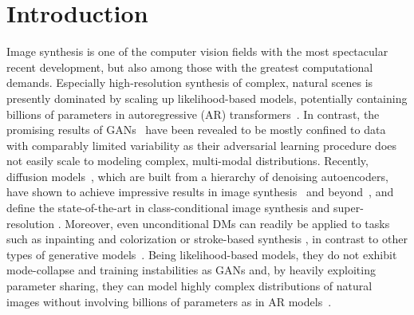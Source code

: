 \documentclass[10pt,twocolumn,letterpaper]{article}
\begin{document}
%
\vspace{-1.5em}
\section{Introduction}
\vspace{-0.5em}
\label{sec:intro}
\enlargethispage{\baselineskip}
%
\firststagecomparison
%
%
%
%
%
%
%
%
%
%
%
%
%
%
%
%
%
%
%
Image synthesis is one of the computer vision fields with the most spectacular recent development, but also among those with the greatest computational demands. Especially high-resolution synthesis of complex, natural scenes is presently dominated by %
scaling up likelihood-based models, potentially containing billions of parameters in autoregressive (AR) transformers~\cite{DBLP:journals/corr/abs-2102-12092, DBLP:conf/nips/RazaviOV19}.
%
%
%
In contrast, the promising results of GANs~\cite{goodfellow2014GAN, bigganbrock, karras2019stylebased} have been revealed to be mostly confined to data with comparably limited variability as their adversarial learning procedure does not easily scale to modeling complex, multi-modal distributions. %
Recently, diffusion models~\cite{DBLP:journals/corr/Sohl-DicksteinW15}, which are built from a hierarchy of denoising autoencoders, have shown to achieve impressive results in image synthesis~\cite{DBLP:conf/nips/HoJA20, DBLP:journals/corr/abs-2011-13456} and beyond~\cite{DBLP:journals/corr/abs-2107-00630, DBLP:conf/iclr/ChenZZWNC21, DBLP:conf/iclr/KongPHZC21, DBLP:journals/corr/abs-2103-16091}, and define the state-of-the-art in class-conditional image synthesis \cite{DBLP:journals/corr/abs-2105-05233, DBLP:journals/corr/abs-2106-15282} and super-resolution \cite{DBLP:journals/corr/abs-2104-07636}. Moreover, even unconditional DMs can readily be applied to tasks such as inpainting and colorization \cite{DBLP:journals/corr/abs-2011-13456} or stroke-based synthesis \cite{DBLP:journals/corr/abs-2108-01073}, in contrast to other types of generative models~\cite{VAE,VAE2,DBLP:conf/iclr/DinhSB17}.
%
%
%
Being likelihood-based models, they do not exhibit mode-collapse and training
instabilities as GANs and, by heavily exploiting parameter sharing,
they can model highly complex distributions of natural images without involving
billions of parameters as in AR
models~\cite{DBLP:conf/nips/RazaviOV19}. %
%
%
%

%
%
%
\vspace{-1.5em}
\end{document}
